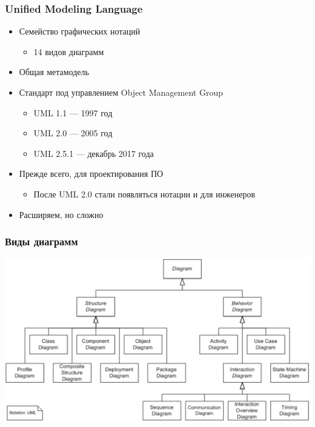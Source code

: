 \documentclass{../../slides-style}
\begin{document}
    \begin{frame}
        \frametitle{Unified Modeling Language}
        \begin{itemize}
            \item Семейство графических нотаций
            \begin{itemize}
                \item 14 видов диаграмм
            \end{itemize}
            \item Общая метамодель
            \item Стандарт под управлением Object Management Group
            \begin{itemize}
                \item UML 1.1 --- 1997 год
                \item UML 2.0 --- 2005 год
                \item UML 2.5.1 --- декабрь 2017 года
            \end{itemize}
            \item Прежде всего, для проектирования ПО
            \begin{itemize}
                \item После UML 2.0 стали появляться нотации и для инженеров
            \end{itemize}
            \item Расширяем, но сложно
        \end{itemize}
    \end{frame}

    \begin{frame}
        \frametitle{Виды диаграмм}
        \begin{center}
            \includegraphics[width=\textwidth]{umlDiagrams.png}
        \end{center}
    \end{frame}
\end{document}
